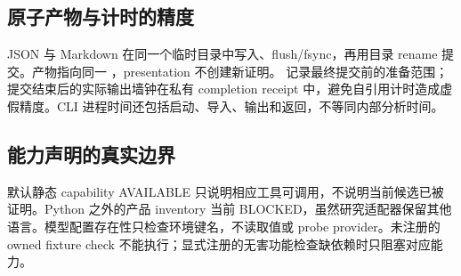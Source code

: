 \subsection{原子产物与计时的精度}
JSON 与 Markdown 在同一个临时目录中写入、flush/fsync，再用目录 rename 提交。产物指向同一 ，presentation 不创建新证明。 记录最终提交前的准备范围；提交结束后的实际输出墙钟在私有 completion receipt 中，避免自引用计时造成虚假精度。CLI 进程时间还包括启动、导入、输出和返回，不等同内部分析时间。

\subsection{能力声明的真实边界}
默认静态 capability AVAILABLE 只说明相应工具可调用，不说明当前候选已被证明。Python 之外的产品 inventory 当前 BLOCKED，虽然研究适配器保留其他语言。模型配置存在性只检查环境键名，不读取值或 probe provider。未注册的 owned fixture check 不能执行；显式注册的无害功能检查缺依赖时只阻塞对应能力。\cite{productguide}
